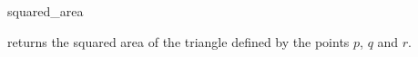 \begin{ccRefFunction}{squared_area}

\ccHtmlNoLinks
{}
{returns the squared area of the triangle defined by the points $p$,
 $q$ and $r$. }
       
\end{ccRefFunction}

